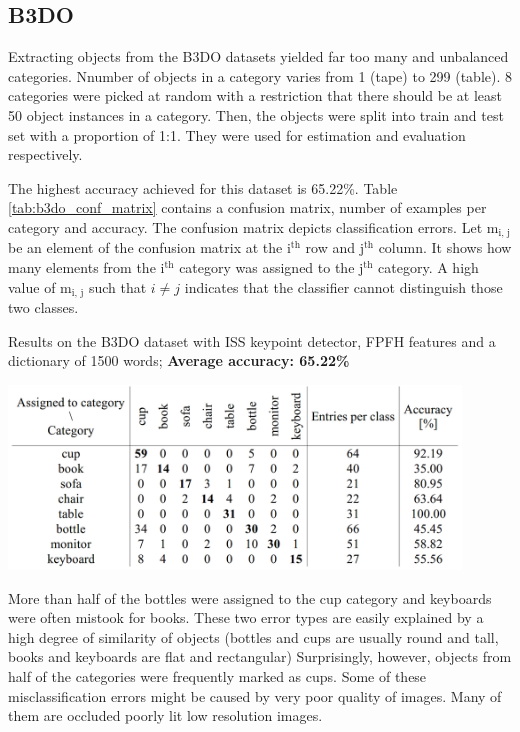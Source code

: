 \documentclass[11pt,twoside]{article}
\newcommand{\superscript}[1]{\ensuremath{^{\textrm{#1}}}}
\newcommand{\subscript}[1]{\ensuremath{_{\textrm{#1}}}}
\begin{document}
  \subsection{B3DO}
    Extracting objects from the B3DO datasets yielded far too many and unbalanced categories. Nnumber of objects in a category varies from 1 (tape) to 299 (table). 8 categories were picked at random with a restriction that there should be at least 50 object instances in a category. Then, the objects were split into train and test set with a proportion of 1:1. They were used for estimation and evaluation respectively.

    The highest accuracy achieved for this dataset is 65.22\%. Table \ref{tab:b3do_conf_matrix} contains a confusion matrix, number of examples per category and accuracy. The confusion matrix depicts classification errors. Let m\subscript{i, j} be an element of the confusion matrix at the i\superscript{th} row and j\superscript{th} column. It shows how many elements from the i\superscript{th} category was assigned to the j\superscript{th} category. A high value of m\subscript{i, j} such that $i \neq j$ indicates that the classifier cannot distinguish those two classes.

    \begin{table}[!ht]
    \centering
    \caption{Results on the B3DO dataset with ISS keypoint detector, FPFH features and a dictionary of 1500 words; \textbf{Average accuracy: 65.22\%}}
    \includegraphics[width=0.9\textwidth]{../figs/b3do_conf_matrix}	
    \label{tab:b3do_conf_matrix}
    \end{table}   

    More than half of the bottles were assigned to the cup category and keyboards were often mistook for books. These two error types are easily explained by a high degree of similarity of objects (bottles and cups are usually round and tall, books and keyboards are flat and rectangular) Surprisingly, however, objects from half of the categories were frequently marked as cups. Some of these misclassification errors might be caused by very poor quality of images. Many of them are occluded poorly lit low resolution images.	
\end{document}
